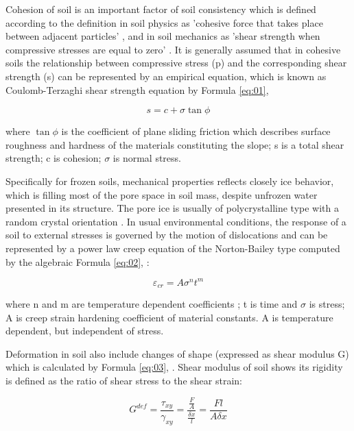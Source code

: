 \documentclass[a4paper,10pt]{article}
\begin{document}
Cohesion of soil is an important factor of soil consistency which is defined according to the definition in soil physics as 'cohesive force that takes place between adjacent particles' \cite{Baver1959}, and in soil mechanics as 'shear strength when compressive stresses are equal to zero' \cite{Yokoi1968}. It is generally assumed that in cohesive soils the relationship between compressive stress (p) and the corresponding shear strength (s) can be represented by an empirical equation, which is known as Coulomb-Terzaghi shear strength equation by Formula \ref{eq:01}, 

\begin{equation}\label{eq:01}
	s=c+\sigma \tan \phi
\end{equation}

where $\tan \phi$ is the coefficient of plane sliding friction  which describes surface roughness and hardness of the materials constituting the slope; s is a total shear strength; c is cohesion; $\sigma$ is normal stress. 

Specifically for frozen soils, mechanical properties reflects closely ice behavior, which is filling most of the pore space in soil mass, despite unfrozen water presented in its structure. The pore ice is usually of polycrystalline type with a random crystal orientation \cite{Merriam1976}. In usual environmental conditions, the response of a soil to external stresses is governed by the motion of dislocations and can be represented by a power law creep equation of the Norton-Bailey type computed by the algebraic Formula \ref{eq:02}, \cite{Bratten2008}:

\begin{equation}\label{eq:02}
	\varepsilon_{cr}=A\sigma^{n}t^{m}
\end{equation}

where n and m are temperature dependent coefficients ; t is time and $\sigma$ is stress; A is creep strain hardening coefficient of material constants. A is temperature dependent, but independent of stress. 

Deformation in soil also include changes of shape (expressed as shear modulus G) which is calculated by Formula \ref{eq:03}, \cite{Millsetal1996}. Shear modulus of soil shows its rigidity is defined as the ratio of shear stress to the shear strain:

\begin{equation}\label{eq:03}
	G^{def}=\frac{\tau_{xy}}{\gamma_{xy}}=\frac{\frac{F}{A}}{\frac{\delta x}{l}}=\frac{Fl}{A\delta x}
\end{equation}
\end{document}
